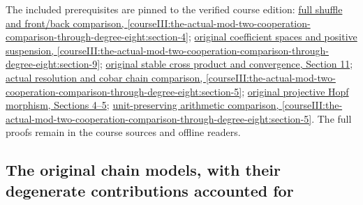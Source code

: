 The included prerequisites are pinned to the verified course edition: \href{https://github.com/KokunoYumeto/open-math-courses/blob/6b801dbf7b1b038ea7eec66b1eb4d07813978c3c/docs/courses/CG-S6/src/thom-euler-for-lesson11.md\#4-products-signs-and-evaluation-on-fibres}{full shuffle and front/back comparison, \cref{courseIII:the-actual-mod-two-cooperation-comparison-through-degree-eight:section-4}}; \href{https://github.com/KokunoYumeto/open-math-courses/blob/6b801dbf7b1b038ea7eec66b1eb4d07813978c3c/docs/courses/CG-S6/src/the-adams-tower-and-exact-inverse-limits.md\#adams-original-spectrum}{original coefficient spaces and positive suspension, \cref{courseIII:the-actual-mod-two-cooperation-comparison-through-degree-eight:section-9}}; \href{https://github.com/KokunoYumeto/open-math-courses/blob/6b801dbf7b1b038ea7eec66b1eb4d07813978c3c/docs/courses/CG-S6/src/the-adams-tower-and-exact-inverse-limits.md\#adams-actual-convergence}{original stable cross product and convergence, Section 11}; \href{https://github.com/KokunoYumeto/open-math-courses/blob/6b801dbf7b1b038ea7eec66b1eb4d07813978c3c/docs/courses/CG-S6/src/the-actual-mod-two-adams-resolution-and-cooperation-maps.md\#cooperation-chain-comparison}{actual resolution and cobar chain comparison, \cref{courseIII:the-actual-mod-two-cooperation-comparison-through-degree-eight:section-5}}; \href{https://github.com/KokunoYumeto/open-math-courses/blob/6b801dbf7b1b038ea7eec66b1eb4d07813978c3c/docs/courses/CG-S6/src/the-original-projective-coordinate-and-actual-cooperations.md\#projective-actual-coproduct}{original projective Hopf morphism, Sections 4--5}; \href{https://github.com/KokunoYumeto/open-math-courses/blob/6b801dbf7b1b038ea7eec66b1eb4d07813978c3c/docs/courses/CG-S6/src/the-original-adams-tower-and-arithmetic-completion.md\#arithmetic-adams-equivalence}{unit-preserving arithmetic comparison, \cref{courseIII:the-actual-mod-two-cooperation-comparison-through-degree-eight:section-5}}. The full proofs remain in the course sources and offline readers.

\subsection{The original chain models, with their degenerate contributions accounted for}
\label{courseIII:the-actual-mod-two-cooperation-comparison-through-degree-eight:actual-eight-chain-models}

\label{courseIII:the-actual-mod-two-cooperation-comparison-through-degree-eight:section-1}\label{courseIII:actual-degree8:1}

